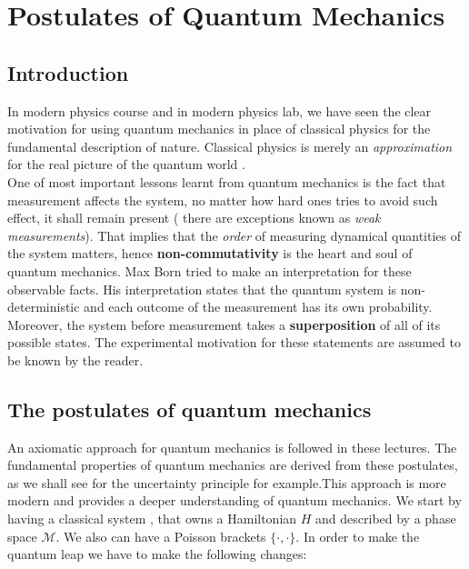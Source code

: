 \chapter{Postulates of Quantum Mechanics}
     \section{ Introduction}
     In modern physics course and in modern physics lab, we have seen the clear motivation for using quantum mechanics in place of classical physics for the fundamental description of nature. Classical physics is merely an \textit{approximation} for the real picture of the quantum world .\\
     One of most important lessons learnt from quantum mechanics is the fact that measurement affects the system, no matter how hard ones tries to avoid such effect, it shall remain present ( there are exceptions known as \textit{weak measurements}). That implies that the \textit{order} of measuring dynamical quantities of the system matters, hence \textbf{non-commutativity} is the heart and soul of quantum mechanics. Max Born tried to make an interpretation for these  observable facts. His interpretation states that the quantum system is non-deterministic and each outcome of the measurement has its own probability. Moreover, the system before measurement takes a \textbf{superposition} of all of its possible states. The experimental motivation for these statements are assumed to be known by the reader. 
     \section{The postulates of quantum mechanics}
     An axiomatic approach for quantum mechanics is followed in these lectures. The fundamental properties of quantum mechanics are derived from these postulates, as we shall see for the uncertainty principle for example.This approach is more modern and provides a deeper understanding of quantum mechanics. 
     We start by having a classical  system , that owns a Hamiltonian $ H$ and described by a phase space $ \mathcal{M}$. We also can have a Poisson brackets $ \{\cdot, \cdot \}$. In order to make the quantum leap we have to make the following changes:
